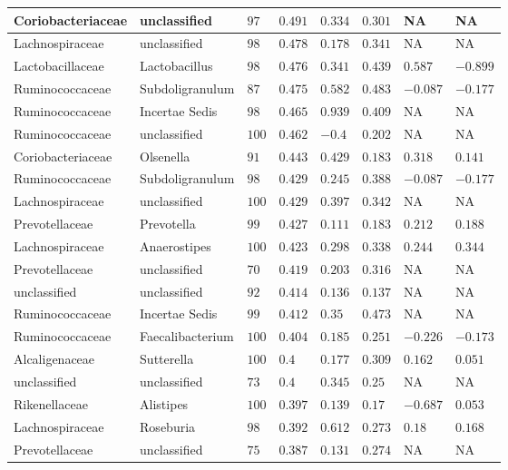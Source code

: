 \begin{table}[!ht]
\begin{tiny}
\begin{tabular}{|l|l|l|l|l|l|l|l|}
Coriobacteriaceae & unclassified & $97$ & $0.491$ & $0.334$ & $0.301$ & NA & NA \\ \hline
Lachnospiraceae & unclassified & $98$ & $0.478$ & $0.178$ & $0.341$ & NA & NA \\ \hline
Lactobacillaceae & Lactobacillus & $98$ & $0.476$ & $0.341$ & $0.439$ & $0.587$ & $-0.899$ \\ \hline
Ruminococcaceae & Subdoligranulum & $87$ & $0.475$ & $0.582$ & $0.483$ & $-0.087$ & $-0.177$ \\ \hline
Ruminococcaceae & Incertae Sedis & $98$ & $0.465$ & $0.939$ & $0.409$ & NA & NA \\ \hline
Ruminococcaceae & unclassified & $100$ & $0.462$ & $-0.4$ & $0.202$ & NA & NA \\ \hline
Coriobacteriaceae & Olsenella & $91$ & $0.443$ & $0.429$ & $0.183$ & $0.318$ & $0.141$ \\ \hline
Ruminococcaceae & Subdoligranulum & $98$ & $0.429$ & $0.245$ & $0.388$ & $-0.087$ & $-0.177$ \\ \hline
Lachnospiraceae & unclassified & $100$ & $0.429$ & $0.397$ & $0.342$ & NA & NA \\ \hline
Prevotellaceae & Prevotella & $99$ & $0.427$ & $0.111$ & $0.183$ & $0.212$ & $0.188$ \\ \hline
Lachnospiraceae & Anaerostipes & $100$ & $0.423$ & $0.298$ & $0.338$ & $0.244$ & $0.344$ \\ \hline
Prevotellaceae & unclassified & $70$ & $0.419$ & $0.203$ & $0.316$ & NA & NA \\ \hline
unclassified & unclassified & $92$ & $0.414$ & $0.136$ & $0.137$ & NA & NA \\ \hline
Ruminococcaceae & Incertae Sedis & $99$ & $0.412$ & $0.35$ & $0.473$ & NA & NA \\ \hline
Ruminococcaceae & Faecalibacterium & $100$ & $0.404$ & $0.185$ & $0.251$ & $-0.226$ & $-0.173$ \\ \hline
Alcaligenaceae & Sutterella & $100$ & $0.4$ & $0.177$ & $0.309$ & $0.162$ & $0.051$ \\ \hline
unclassified & unclassified & $73$ & $0.4$ & $0.345$ & $0.25$ & NA & NA \\ \hline
Rikenellaceae & Alistipes & $100$ & $0.397$ & $0.139$ & $0.17$ & $-0.687$ & $0.053$ \\ \hline
Lachnospiraceae & Roseburia & $98$ & $0.392$ & $0.612$ & $0.273$ & $0.18$ & $0.168$ \\ \hline
Prevotellaceae & unclassified & $75$ & $0.387$ & $0.131$ & $0.274$ & NA & NA \\ \hline

\end{tabular}
\end{tiny}
\end{table}
